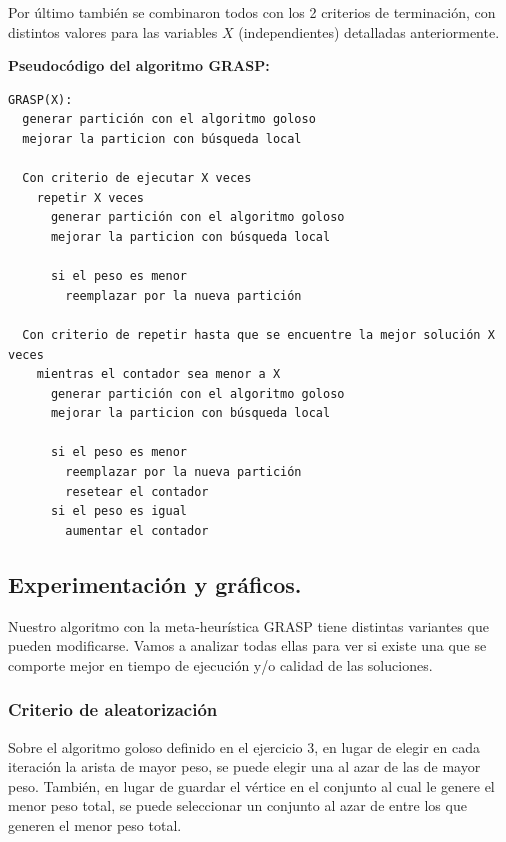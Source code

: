 Por último también se combinaron todos con los 2 criterios de terminación, con distintos valores para las variables $X$ (independientes) detalladas anteriormente.

\vspace*{0.75cm}

\textbf{Pseudocódigo del algoritmo GRASP:}

\vspace*{0.1cm}

\begin{verbatim}
GRASP(X):
  generar partición con el algoritmo goloso
  mejorar la particion con búsqueda local

  Con criterio de ejecutar X veces
    repetir X veces
      generar partición con el algoritmo goloso
      mejorar la particion con búsqueda local

      si el peso es menor
        reemplazar por la nueva partición

  Con criterio de repetir hasta que se encuentre la mejor solución X veces
    mientras el contador sea menor a X
      generar partición con el algoritmo goloso
      mejorar la particion con búsqueda local

      si el peso es menor
        reemplazar por la nueva partición
        resetear el contador
      si el peso es igual
        aumentar el contador
\end{verbatim}

\newpage
\subsection{Experimentación y gráficos.}
\vspace*{0.3cm}

Nuestro algoritmo con la meta-heurística GRASP tiene distintas variantes que
pueden modificarse. Vamos a analizar todas ellas para ver si existe una que
se comporte mejor en tiempo de ejecución y/o calidad de las soluciones.

\subsubsection{Criterio de aleatorización}

Sobre el algoritmo goloso definido en el ejercicio 3, en lugar de elegir en cada iteración la arista de mayor peso, se puede elegir una al azar de las de mayor peso. También, en lugar de guardar el vértice en el conjunto al cual le genere el menor peso total, se puede seleccionar un conjunto al azar de entre los que generen el menor peso total.

